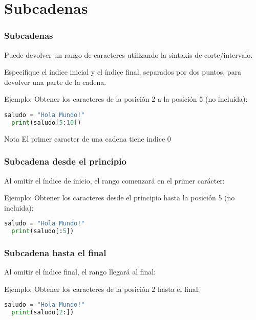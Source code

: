 \section{Subcadenas}

\begin{frame}[fragile]
  \frametitle{Subcadenas}

  Puede devolver un rango de caracteres utilizando la sintaxis de
  corte/intervalo.

  \vspace{\baselineskip}
  Especifique el índice inicial y el índice final, separados por dos puntos,
  para devolver una parte de la cadena.

  \vspace{\baselineskip}
  Ejemplo: Obtener los caracteres de la posición 2 a la posición 5 (no incluida):
  \begin{lstlisting}[language=Python]
  saludo = "Hola Mundo!"
  print(saludo[5:10])
  \end{lstlisting}

  \begin{exampleblock}{Nota}
    El primer caracter de una cadena tiene indice 0
  \end{exampleblock}
\end{frame}

\begin{frame}[fragile]
  \frametitle{Subcadena desde el principio}

  Al omitir el índice de inicio, el rango comenzará en el primer carácter:

  \vspace{\baselineskip}
  Ejemplo: Obtener los caracteres desde el principio hasta la posición 5 (no incluida):
  \begin{lstlisting}[language=Python]
  saludo = "Hola Mundo!"
  print(saludo[:5])
  \end{lstlisting}
\end{frame}

\begin{frame}[fragile]
  \frametitle{Subcadena hasta el final}

  Al omitir el índice final, el rango llegará al final:

  \vspace{\baselineskip}
  Ejemplo: Obtener los caracteres de la posición 2 hasta el final:
  \begin{lstlisting}[language=Python]
  saludo = "Hola Mundo!"
  print(saludo[2:])
  \end{lstlisting}
\end{frame}

